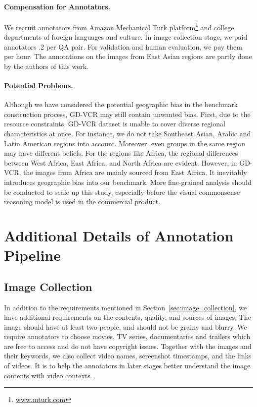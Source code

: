 \documentclass[11pt]{article}
\begin{document}
\paragraph{Compensation for Annotators.}
We recruit annotators from Amazon Mechanical Turk platform\footnote{\url{www.mturk.com}} and college departments of foreign languages and culture. In image collection stage, we paid annotators \0.2 per QA pair. For validation and human evaluation, we pay them  per hour. 
The annotations on the images from East Asian regions are partly done by the authors of this work.

\paragraph{Potential Problems.}
Although we have considered the potential geographic bias in the benchmark construction process, GD-VCR may still contain unwanted bias. First, due to the resource constraints, GD-VCR dataset is unable to cover diverse regional characteristics at once. For instance, we do not take Southeast Asian, Arabic and Latin American regions into account. Moreover, even groups in the same region may have different beliefs. For the regions like Africa, the regional differences between West Africa, East Africa, and North Africa are evident. However, in GD-VCR, the images from Africa are mainly sourced from East Africa. It inevitably introduces geographic bias into our benchmark. More fine-grained analysis should be conducted to scale up this study, especially before the visual commonsense reasoning model is used in the commercial product.




\appendix

\clearpage

\section{Additional Details of Annotation Pipeline}
\label{sec:appendix}
\subsection{Image Collection}
\label{appendix:image_collection_1}
In addition to the requirements mentioned in Section~\ref{sec:image_collection}, we have additional requirements on the contents, quality, and sources of images. The image should have at least two people, and should not be grainy and blurry. We require annotators to choose movies, TV series, documentaries and trailers which are free to access and do not have copyright issues. Together with the images and their keywords, we also collect video names, screenshot timestamps, and the links of videos. It is to help the annotators in later stages better understand the image contents with video contexts.
\end{document}
